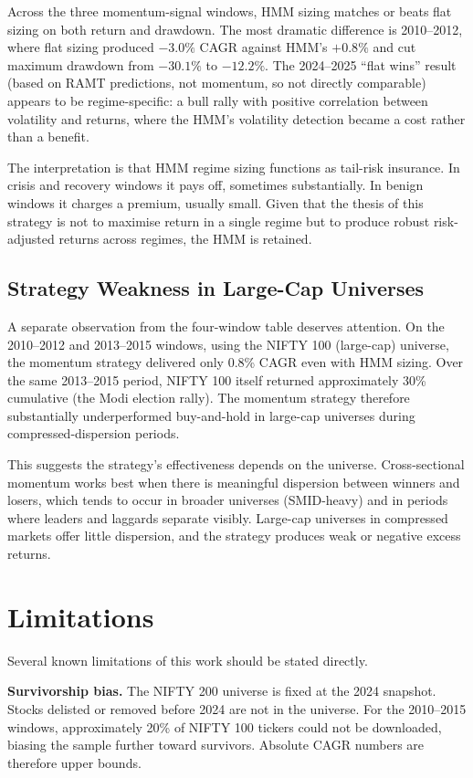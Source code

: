 \documentclass[conference]{IEEEtran}
\begin{document}
Across the three momentum-signal windows, HMM sizing matches or beats flat sizing on both return and drawdown. The most dramatic difference is 2010--2012, where flat sizing produced $-3.0\%$ CAGR against HMM's $+0.8\%$ and cut maximum drawdown from $-30.1\%$ to $-12.2\%$. The 2024--2025 ``flat wins'' result (based on RAMT predictions, not momentum, so not directly comparable) appears to be regime-specific: a bull rally with positive correlation between volatility and returns, where the HMM's volatility detection became a cost rather than a benefit.

The interpretation is that HMM regime sizing functions as tail-risk insurance. In crisis and recovery windows it pays off, sometimes substantially. In benign windows it charges a premium, usually small. Given that the thesis of this strategy is not to maximise return in a single regime but to produce robust risk-adjusted returns across regimes, the HMM is retained.

\subsection{Strategy Weakness in Large-Cap Universes}

A separate observation from the four-window table deserves attention. On the 2010--2012 and 2013--2015 windows, using the NIFTY 100 (large-cap) universe, the momentum strategy delivered only 0.8\% CAGR even with HMM sizing. Over the same 2013--2015 period, NIFTY 100 itself returned approximately 30\% cumulative (the Modi election rally). The momentum strategy therefore substantially underperformed buy-and-hold in large-cap universes during compressed-dispersion periods.

This suggests the strategy's effectiveness depends on the universe. Cross-sectional momentum works best when there is meaningful dispersion between winners and losers, which tends to occur in broader universes (SMID-heavy) and in periods where leaders and laggards separate visibly. Large-cap universes in compressed markets offer little dispersion, and the strategy produces weak or negative excess returns.

\section{Limitations}
\label{sec:limitations}

Several known limitations of this work should be stated directly.

\textbf{Survivorship bias.} The NIFTY 200 universe is fixed at the 2024 snapshot. Stocks delisted or removed before 2024 are not in the universe. For the 2010--2015 windows, approximately 20\% of NIFTY 100 tickers could not be downloaded, biasing the sample further toward survivors. Absolute CAGR numbers are therefore upper bounds.
\end{document}
